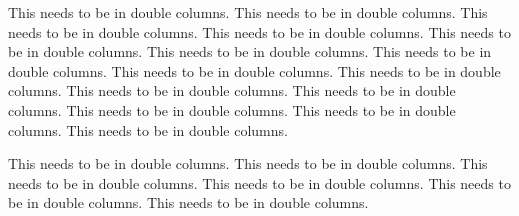 \documentclass[12pt,twoside,a4paper]{article}
\begin{document}
\begin{multicols}{3}
  \setlength{\columnsep}{0.5cm}
  \setlength{\columnseprule}{} %

\newline This needs to be in double columns. This needs to be in double columns.
\newline This needs to be in double columns. This needs to be in double columns.
\newline This needs to be in double columns. This needs to be in double columns.
\newline This needs to be in double columns. This needs to be in double columns.
\newline This needs to be in double columns. This needs to be in double columns.
\newline This needs to be in double columns. This needs to be in double columns.
\newline This needs to be in double columns. This needs to be in double columns.

\columnbreak %

\newline This needs to be in double columns. This needs to be in double columns.
\newline This needs to be in double columns. This needs to be in double columns.
\newline This needs to be in double columns. This needs to be in double columns.
\end{multicols}
\end{document}
